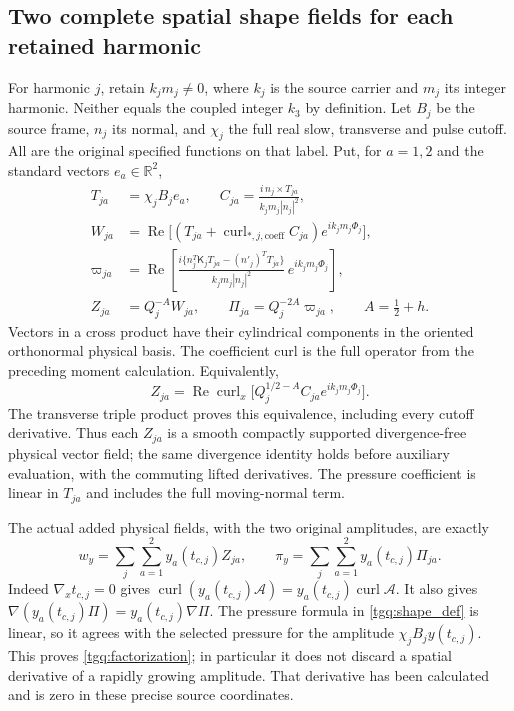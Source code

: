 \documentclass[11pt]{article}
\begin{document}
\subsection{Two complete spatial shape fields for each retained harmonic}
\label{tgq:shapes}
For harmonic $j$, retain $k_jm_j\ne0$, where $k_j$ is the source
carrier and $m_j$ its integer harmonic. Neither equals the coupled
integer $k_3$ by definition. Let $B_j$ be the source frame, $n_j$ its
normal, and $\chi_j$ the full real slow, transverse and pulse cutoff.
All are the original specified functions on that label. Put, for
$a=1,2$ and the standard vectors $e_a\in\mathbb R^2$,
\begin{equation}
 \begin{split}
 T_{ja}&=\chi_jB_je_a,\qquad
 C_{ja}=\frac{i\,n_j\times T_{ja}}{k_jm_j|n_j|^2},\\
 W_{ja}&=\operatorname{Re}
       \bigl[(T_{ja}+\operatorname{curl}_{*,j,\mathrm{coeff}}C_{ja})
                              e^{ik_jm_j\Phi_j}\bigr],\\
 \varpi_{ja}
  &=\operatorname{Re}\left[
    \frac{i\{n_j^T\mathsf K_jT_{ja}-(n'_j)^TT_{ja}\}}
                {k_jm_j|n_j|^2}\,e^{ik_jm_j\Phi_j}\right],\\
 Z_{ja}&=Q_j^{-A}W_{ja},\qquad
 \Pi_{ja}=Q_j^{-2A}\varpi_{ja},\qquad A=\tfrac12+h .
 \end{split}\label{tgq:shape_def}
\end{equation}
Vectors in a cross product have their cylindrical components in the
oriented orthonormal physical basis. The coefficient curl is the full
operator from the preceding moment calculation. Equivalently,
\[
 Z_{ja}=\operatorname{Re}\operatorname{curl}_x
      \bigl[Q_j^{1/2-A}C_{ja}e^{ik_jm_j\Phi_j}\bigr].
\]
The transverse triple product proves this equivalence, including every
cutoff derivative. Thus each $Z_{ja}$ is a smooth compactly supported
divergence-free physical vector field; the same divergence identity
holds before auxiliary evaluation, with the commuting lifted
derivatives. The pressure coefficient is linear in $T_{ja}$ and includes
the full moving-normal term.

The actual added physical fields, with the two original amplitudes,
are exactly
\begin{equation}
 w_y=\sum_j\sum_{a=1}^2 y_a(t_{c,j}) Z_{ja},\qquad
 \pi_y=\sum_j\sum_{a=1}^2 y_a(t_{c,j})\Pi_{ja}.
 \label{tgq:factorization}
\end{equation}
Indeed $\nabla_xt_{c,j}=0$ gives
$\operatorname{curl}(y_a(t_{c,j})\mathcal A)=
y_a(t_{c,j})\operatorname{curl}\mathcal A$. It also gives
$\nabla(y_a(t_{c,j})\Pi)=y_a(t_{c,j})\nabla\Pi$.
The pressure formula in \eqref{tgq:shape_def} is linear, so it agrees
with the selected pressure for the amplitude $\chi_jB_jy(t_{c,j})$.
This proves \eqref{tgq:factorization}; in particular it does not discard
a spatial derivative of a rapidly growing amplitude. That derivative
has been calculated and is zero in these precise source coordinates.
\end{document}
